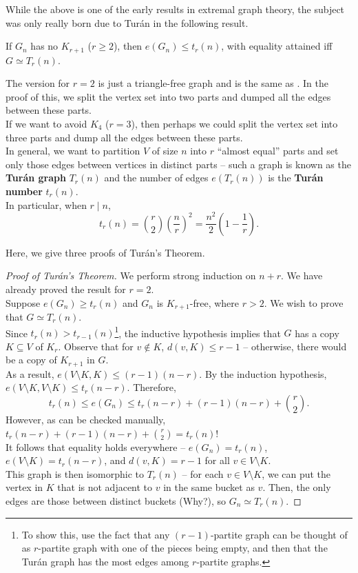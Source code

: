 \documentclass{article}
\begin{document}
		While the above is one of the early results in extremal graph theory, the subject was only really born due to Tur\'{a}n in the following result.

		\begin{ftheo}
			If $G_n$ has no $K_{r+1}$ ($r \ge 2$), then $e(G_n) \le t_r(n)$, with equality attained iff $G \simeq T_r(n)$.
		\end{ftheo}

		The version for $r=2$ is just a triangle-free graph and is the same as . In the proof of this, we split the vertex set into two parts and dumped all the edges between these parts.\\
		If we want to avoid $K_4$ ($r=3$), then perhaps we could split the vertex set into three parts and dump all the edges between these parts.\\
		In general, we want to partition $V$ of size $n$ into $r$ ``almost equal'' parts and set only those edges between vertices in distinct parts -- such a graph is known as the \textbf{Tur\'{a}n graph} $T_r(n)$ and the number of edges $e(T_r(n))$ is the \textbf{Tur\'{a}n number} $t_r(n)$.\\
		In particular, when $r \mid n$,
		\[ t_r(n) = \binom{r}{2} \left(\frac{n}{r}\right)^2 = \frac{n^2}{2} \left(1 - \frac{1}{r}\right). \]


		Here, we give three proofs of Tur\'{a}n's Theorem.

		\begin{proof}[Proof of Tur\'{a}n's Theorem]
			We perform strong induction on $n+r$. We have already proved the result for $r=2$.\\
			Suppose $e(G_n) \ge t_r(n)$ and $G_n$ is $K_{r+1}$-free, where $r > 2$. We wish to prove that $G \simeq T_r(n)$.\\
			Since $t_r(n) > t_{r-1}(n)$\footnote{To show this, use the fact that any $(r-1)$-partite graph can be thought of as $r$-partite graph with one of the pieces being empty, and then that the Tur\'{a}n graph has the most edges among $r$-partite graphs.}, the inductive hypothesis implies that $G$ has a copy $K \subseteq V$ of $K_r$. Observe that for $v \not\in K$, $d(v,K) \le r-1$ -- otherwise, there would be a copy of $K_{r+1}$ in $G$.\\
			As a result, $e(V \setminus K, K) \le (r-1)(n-r)$. By the induction hypothesis, $e(V\setminus K, V\setminus K) \le t_r(n-r)$. Therefore,
			\[ t_r(n) \le e(G_n) \le t_r(n-r) + (r-1)(n-r) + \binom{r}{2}. \]
			However, as can be checked manually, $t_r(n-r) + (r-1)(n-r) + \binom{r}{2} = t_r(n)$!\\
			It follows that equality holds everywhere -- $e(G_n) = t_r(n)$, $e(V \setminus K) = t_r(n-r)$, and $d(v,K) = r-1$ for all $v \in V \setminus K$.\\
			This graph is then isomorphic to $T_r(n)$ -- for each $v \in V \setminus K$, we can put the vertex in $K$ that is not adjacent to $v$ in the same bucket as $v$. Then, the only edges are those between distinct buckets (Why?), so $G_n \simeq T_r(n)$.
		\end{proof}
\end{document}
